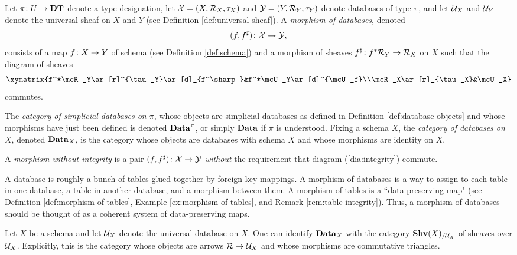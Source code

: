 \documentclass{amsart}
\def\DT{{\bf DT}}
\def\Data{{\bf Data}}
\begin{document}
\begin{definition}\label{def:database morphisms}

Let $\pi\taking U\to\DT$ denote a type designation, let $\mathcal{X}=(X,\mathcal{R}_X,\tau_X)$ and $\mathcal{Y}=(Y,\mathcal{R}_Y,\tau_Y)$ denote databases of type $\pi$, and let $\mathcal{U}_X$ and $\mathcal{U}_Y$ denote the universal sheaf on $X$ and $Y$ (see Definition \ref{def:universal sheaf}).  A {\em morphism of databases}, denoted $$(f,f^\sharp)\colon\mathcal{X}\rightarrow\mathcal{Y},$$ consists of a map $f\colon X\rightarrow Y$ of schema (see Definition \ref{def:schema}) and a morphism of sheaves $f^\sharp\colon f^*\mathcal{R}_Y\rightarrow\mathcal{R}_X$ on $X$ such that the diagram of sheaves \begin{eqnarray}\label{dia:integrity}\xymatrix{f^*\mcR_Y\ar[r]^{\tau_Y}\ar[d]_{f^\sharp}&f^*\mcU_Y\ar[d]^{\mcU_f}\\\mcR_X\ar[r]_{\tau_X}&\mcU_X}\end{eqnarray} commutes.

The {\em category of simplicial databases on $\pi$}, whose objects are simplicial databases as defined in Definition \ref{def:database objects} and whose morphisms have just been defined is denoted $\Data^\pi$, or simply $\Data$ if $\pi$ is understood.  Fixing a schema $X$, the {\em category of databases on $X$}, denoted $\Data_X$, is the category whose objects are databases with schema $X$ and whose morphisms are identity on $X$.  

A {\em morphism without integrity} is a pair $(f,f^\sharp)\colon\mathcal{X}\rightarrow\mathcal{Y}$ {\em without} the requirement that diagram (\ref{dia:integrity}) commute.

\end{definition}

\begin{remark}\label{rem:data integrity}

A database is roughly a bunch of tables glued together by foreign key mappings.  A morphism of databases is a way to assign to each table in one database, a table in another database, and a morphism between them.  A morphism of tables is a ``data-preserving map" (see Definition \ref{def:morphism of tables}, Example \ref{ex:morphism of tables}, and Remark \ref{rem:table integrity}).  Thus, a morphism of databases should be thought of as a coherent system of data-preserving maps.

\end{remark}

\begin{remark}\label{rem:data_X}

Let $X$ be a schema and let $\mathcal{U}_X$ denote the universal database on $X$.  One can identify $\Data_X$ with the category ${\bf Shv}(X)_{/\mathcal{U}_X}$ of sheaves over $\mathcal{U}_X$.  Explicitly, this is the category whose objects are arrows $\mathcal{R}\rightarrow\mathcal{U}_X$ and whose morphisms are commutative triangles.

\end{remark}
\end{document}
